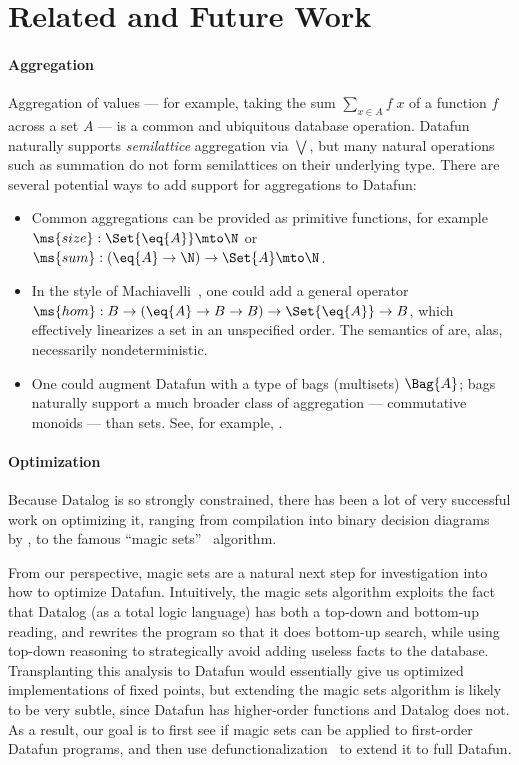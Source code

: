 \section{Related and Future Work}
\label{sec:futurework}

\paragraph{Aggregation}
Aggregation of values --- for example, taking the sum $\sum_{x \in A} f \;x$ of
a function $f$ across a set $A$ --- is a common and ubiquitous database
operation. Datafun naturally supports \emph{semilattice} aggregation via
$\bigvee$, but many natural operations such as summation do not form
semilattices on their underlying type. There are several potential ways to add
support for aggregations to Datafun:
\begin{itemize}
\item Common aggregations can be provided as primitive functions, for example
  $\ms{size} : \Set{\eq{A}} \mto \N$ or $\ms{sum} : (\eq{A} \to \N) \uto \Set{A}
  \mto \N$.

\item In the style of Machiavelli~\cite{machiavelli}, one could add a general
  operator $\ms{hom} : B \to (\eq{A} \uto B \uto B) \uto \Set{\eq{A}} \uto B$,
  which effectively linearizes a set in an unspecified order. The semantics of
   are, alas, necessarily nondeterministic.

\item One could augment Datafun with a type of bags (multisets) $\Bag{A}$; bags
  naturally support a much broader class of aggregation --- commutative monoids
  --- than sets. See, for example, \citet{multilinear-bigdata}.
\end{itemize}

\paragraph{Optimization} Because Datalog is so strongly constrained,
there has been a lot of very successful work on optimizing it, ranging
from compilation into binary decision diagrams~\cite{bdd} by
\citet{whaley-lam}, to the famous ``magic sets''~\cite{magicsets}
algorithm.

From our perspective, magic sets are a natural next step for
investigation into how to optimize Datafun. Intuitively, the magic
sets algorithm exploits the fact that Datalog (as a total logic
language) has both a top-down and bottom-up reading, and rewrites the
program so that it does bottom-up search, while using top-down
reasoning to strategically avoid adding useless facts to the
database. Transplanting this analysis to Datafun would essentially
give us optimized implementations of fixed points, but extending the
magic sets algorithm is likely to be very subtle, since Datafun has
higher-order functions and Datalog does not. As a result, our goal is
to first see if magic sets can be applied to first-order Datafun programs,
and then use defunctionalization~\cite{defunctionalization} to
extend it to full Datafun.

